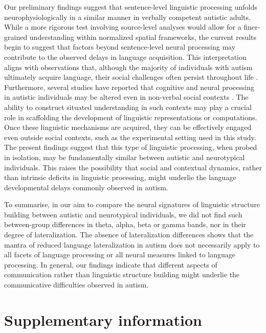 Our preliminary findings suggest that sentence-level linguistic processing unfolds neurophysiologically in a similar manner in verbally competent autistic adults. While a more rigorous test involving source-level analyses would allow for a finer-grained understanding within normalized spatial frameworks, the current results begin to suggest that factors beyond sentence-level neural processing may contribute to the observed delays in language acquisition. This interpretation aligns with observations that, although the majority of individuals with autism ultimately acquire language, their social challenges often persist throughout life \citep{anderson2007}. Furthermore, several studies have reported that cognitive and neural processing in autistic individuals may be altered even in non-verbal social contexts \citep{mangnus2024bpcnni,wadge2019}. The ability to construct situated understanding in such contexts may play a crucial role in scaffolding the development of linguistic representations or computations. Once these linguistic mechanisms are acquired, they can be effectively engaged even outside social contexts, such as the experimental setting used in this study. The present findings suggest that this type of linguistic processing, when probed in isolation, may be fundamentally similar between autistic and neurotypical individuals. This raises the possibility that social and contextual dynamics, rather than intrinsic deficits in linguistic processing, might underlie the language developmental delays commonly observed in autism. 

To summarise, in our aim to compare the neural signatures of linguistic structure building between autistic and neurotypical individuals, we did not find such between-group differences in theta, alpha, beta or gamma bands, nor in their degree of lateralization. The absence of lateralization differences shows that the mantra of reduced language lateralization in autism does not necessarily apply to all facets of language processing or all neural measures linked to language processing. In general, our findings indicate that different aspects of communication rather than linguistic structure building might underlie the communicative difficulties observed in autism.


\newpage

\section{Supplementary information}

